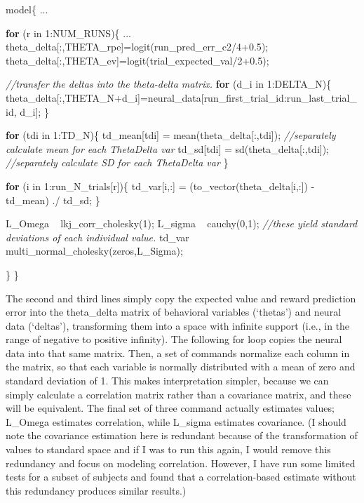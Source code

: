 \documentclass[]{article}
\newenvironment{Shaded}{\begin{snugshade}}{\end{snugshade}}
\newcommand{\KeywordTok}[1]{\textcolor[rgb]{0.13,0.29,0.53}{\textbf{{#1}}}}
\newcommand{\DecValTok}[1]{\textcolor[rgb]{0.00,0.00,0.81}{{#1}}}
\newcommand{\FloatTok}[1]{\textcolor[rgb]{0.00,0.00,0.81}{{#1}}}
\newcommand{\CommentTok}[1]{\textcolor[rgb]{0.56,0.35,0.01}{\textit{{#1}}}}
\newcommand{\NormalTok}[1]{{#1}}
\begin{document}
\begin{Shaded}
\begin{Highlighting}[]
\NormalTok{model\{}
  \NormalTok{...}
  
  \KeywordTok{for} \NormalTok{(r in }\DecValTok{1}\NormalTok{:NUM_RUNS)\{}
    \NormalTok{...}
    \NormalTok{theta_delta[:,THETA_rpe]=logit(run_pred_err_c2/}\DecValTok{4}\FloatTok{+0.5}\NormalTok{);}
    \NormalTok{theta_delta[:,THETA_ev]=logit(trial_expected_val/}\DecValTok{2}\FloatTok{+0.5}\NormalTok{);}
    
    \CommentTok{//transfer the deltas into the theta-delta matrix.}
    \KeywordTok{for} \NormalTok{(d_i in }\DecValTok{1}\NormalTok{:DELTA_N)\{}
      \NormalTok{theta_delta[:,THETA_N+d_i]=neural_data[run_first_trial_id:run_last_trial_id, d_i];}
    \NormalTok{\}}
  
    \KeywordTok{for} \NormalTok{(tdi in }\DecValTok{1}\NormalTok{:TD_N)\{}
      \NormalTok{td_mean[tdi] = mean(theta_delta[:,tdi]);  }\CommentTok{//separately calculate mean for each ThetaDelta var}
      \NormalTok{td_sd[tdi] = sd(theta_delta[:,tdi]);      }\CommentTok{//separately calculate SD for each ThetaDelta var}
    \NormalTok{\}}
  
    \KeywordTok{for} \NormalTok{(i in }\DecValTok{1}\NormalTok{:run_N_trials[r])\{}
      \NormalTok{td_var[i,:] = (to_vector(theta_delta[i,:]) - td_mean) ./ td_sd;}
    \NormalTok{\}}
  
    \NormalTok{L_Omega ~ lkj_corr_cholesky(}\DecValTok{1}\NormalTok{);}
    \NormalTok{L_sigma ~ cauchy(}\DecValTok{0}\NormalTok{,}\DecValTok{1}\NormalTok{); }\CommentTok{//these yield standard deviations of each individual value.}
    \NormalTok{td_var ~ multi_normal_cholesky(zeros,L_Sigma);}
    
  \NormalTok{\}}
\NormalTok{\}}
\end{Highlighting}
\end{Shaded}

The second and third lines simply copy the expected value and reward
prediction error into the \textbar{}theta\_delta\textbar{} matrix of
behavioral variables (`thetas') and neural data (`deltas'), transforming
them into a space with infinite support (i.e., in the range of negative
to positive infinity). The following \textbar{}for\textbar{} loop copies
the neural data into that same matrix. Then, a set of commands normalize
each column in the matrix, so that each variable is normally distributed
with a mean of zero and standard deviation of 1. This makes
interpretation simpler, because we can simply calculate a correlation
matrix rather than a covariance matrix, and these will be equivalent.
The final set of three command actually estimates values; L\_Omega
estimates correlation, while L\_sigma estimates covariance. (I should
note the covariance estimation here is redundant because of the
transformation of values to standard space and if I was to run this
again, I would remove this redundancy and focus on modeling correlation.
However, I have run some limited tests for a subset of subjects and
found that a correlation-based estimate without this redundancy produces
similar results.)
\end{document}
